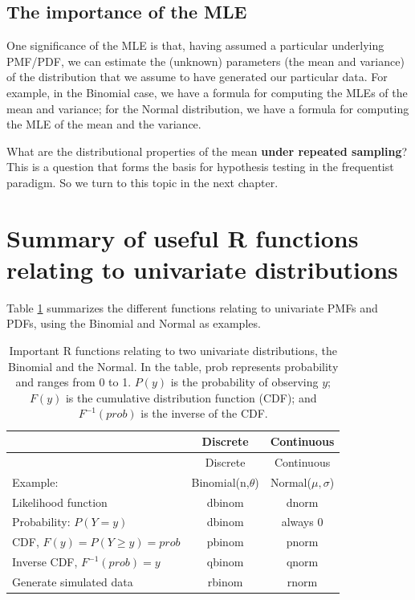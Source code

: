 \documentclass[12pt,]{krantz}
\begin{document}
\hypertarget{the-importance-of-the-mle}{%
\subsection{The importance of the MLE}\label{the-importance-of-the-mle}}

One significance of the MLE is that, having assumed a particular underlying PMF/PDF, we can estimate the (unknown) parameters (the mean and variance) of the distribution that we assume to have generated our particular data. For example, in the Binomial case, we have a formula for computing the MLEs of the mean and variance; for the Normal distribution, we have a formula for computing the MLE of the mean and the variance.

What are the distributional properties of the mean \textbf{under repeated sampling}? This is a question that forms the basis for hypothesis testing in the frequentist paradigm. So we turn to this topic in the next chapter.

\hypertarget{summary-of-useful-r-functions-relating-to-univariate-distributions}{%
\section{Summary of useful R functions relating to univariate distributions}\label{summary-of-useful-r-functions-relating-to-univariate-distributions}}

Table \ref{tab:dpqrfunctions} summarizes the different functions relating to univariate PMFs and PDFs, using the Binomial and Normal as examples.

\begin{longtable}[]{@{}lcc@{}}
\caption{\label{tab:dpqrfunctions} Important R functions relating to two univariate distributions, the Binomial and the Normal. In the table, prob represents probability and ranges from 0 to 1. \(P(y)\) is the probability of observing \(y\); \(F(y)\) is the cumulative distribution function (CDF); and \(F^{-1}(prob)\) is the inverse of the CDF.}\tabularnewline
\toprule
& Discrete & Continuous\tabularnewline
\midrule
\endfirsthead
\toprule
& Discrete & Continuous\tabularnewline
\midrule
\endhead
Example: & Binomial(n,\(\theta\)) & Normal(\(\mu,\sigma\))\tabularnewline
Likelihood function & dbinom & dnorm\tabularnewline
Probability: \(P(Y=y)\) & dbinom & always 0\tabularnewline
CDF, \(F(y)=P(Y\geq y)=prob\) & pbinom & pnorm\tabularnewline
Inverse CDF, \(F^{-1}(prob)=y\) & qbinom & qnorm\tabularnewline
Generate simulated data & rbinom & rnorm\tabularnewline
\bottomrule
\end{longtable}
\end{document}
